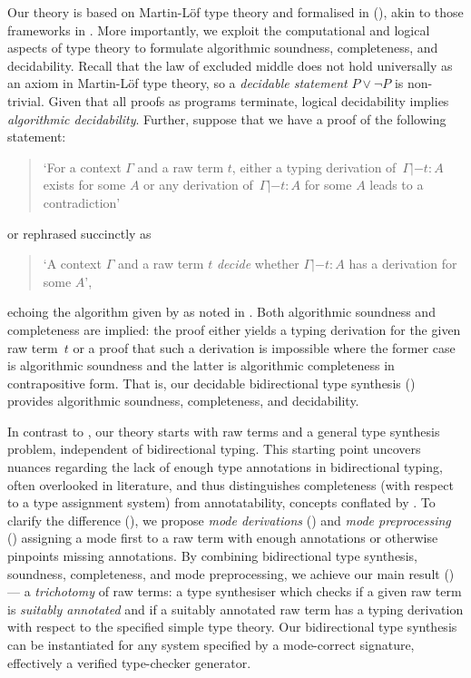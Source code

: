 Our theory is based on Martin-L\"of type theory and formalised in \Agda (), akin to those frameworks in .
More importantly, we exploit the computational and logical aspects of type theory to formulate algorithmic soundness, completeness, and decidability. 
Recall that the law of excluded middle does not hold universally as an axiom in Martin-L\"of type theory, so a \emph{decidable statement} $P \vee \neg P$ is non-trivial.
Given that all proofs as programs terminate, logical decidability implies \emph{algorithmic decidability}.
Further, suppose that we have a proof of the following statement:
\begin{quote}
  `For a context $\Gamma$ and a raw term $t$, either a typing derivation of\, $\Gamma |- t : A$ exists for some $A$ or any derivation of\, $\Gamma |- t : A$ for some $A$ leads to a contradiction'
\end{quote}
or rephrased succinctly as 
\begin{quote}
  `A context $\Gamma$ and a raw term $t$ \emph{decide} whether $\Gamma |- t : A$ has a derivation for some $A$',
\end{quote}
echoing the algorithm given by \citeauthor{Wadler2022} as noted in .
Both algorithmic soundness and completeness are implied:
the proof either yields a typing derivation for the given raw term~$t$ or a proof that such a derivation is impossible where the former case is algorithmic soundness and the latter is algorithmic completeness in contrapositive form.
That is, our decidable bidirectional type synthesis () provides algorithmic soundness, completeness, and decidability. 

In contrast to \citeauthor{Wadler2022}, our theory starts with raw terms and a general type synthesis problem, independent of bidirectional typing.
This starting point uncovers nuances regarding the lack of enough type annotations in bidirectional typing, often overlooked in literature, and thus distinguishes completeness (with respect to a type assignment system) from annotatability, concepts conflated by \citet{Dunfield2021}. 
To clarify the difference (), we propose \emph{mode derivations} () and \emph{mode preprocessing} () assigning a mode first to a raw term with enough annotations or otherwise pinpoints missing annotations.
By combining bidirectional type synthesis, soundness, completeness, and mode preprocessing, we achieve our main result () --- a \emph{trichotomy} of raw terms: a type synthesiser which checks if a given raw term is \emph{suitably annotated} and if a suitably annotated raw term has a typing derivation with respect to the specified simple type theory.
Our bidirectional type synthesis can be instantiated for any system specified by a mode-correct signature, effectively a verified type-checker generator. 

